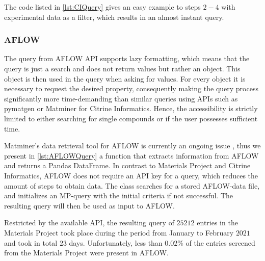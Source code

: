 The code listed in \autoref{lst:CIQuery} gives an easy example to steps $2-4$ with experimental data as a filter, which results in an almost instant query.



\subsubsection{AFLOW}

The query from AFLOW API \cite{Curtarolo2012} supports lazy formatting, which means that the query is just a search and does not return values but rather an object. This object is then used in the query when asking for values. For every object it is necessary to request the desired property, consequently making the query process significantly more time-demanding than similar queries using APIs such as pymatgen or Matminer for Citrine Informatics. Hence, the accessibility is strictly limited to either searching for single compounds or if the user possesses sufficient time.

Matminer's data retrieval tool for AFLOW is currently an ongoing issue \cite{Rosenbrock2017}, thus we present in \autoref{lst:AFLOWQuery} a function that extracts information from AFLOW and returns a Pandas DataFrame. In contrast to Materials Project and Citrine Informatics, AFLOW does not require an API key for a query, which reduces the amount of steps to obtain data. The class searches for a stored AFLOW-data file, and initializes an MP-query with the initial criteria if not successful. The resulting query will then be used as input to AFLOW.



Restricted by the available API, the resulting query of $25212$ entries in the Materials Project took place during the period from January to February $2021$ and took in total $23$ days. Unfortunately, less than $0.02$\% of the entries screened from the Materials Project were present in AFLOW.

